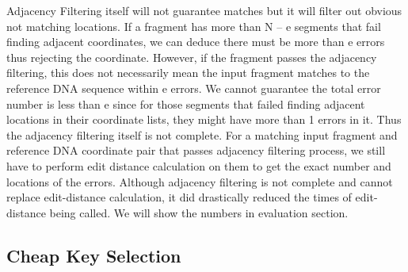 Adjacency Filtering itself will not guarantee matches but it will filter out
obvious not matching locations. If a fragment has more than N – e segments that
fail finding adjacent coordinates, we can deduce there must be more than e
errors thus rejecting the coordinate. However, if the fragment passes the
adjacency filtering, this does not necessarily mean the input fragment matches
to the reference DNA sequence within e errors. We cannot guarantee the total
error number is less than e since for those segments that failed finding
adjacent locations in their coordinate lists, they might have more than 1
errors in it.  Thus the adjacency filtering itself is not complete. For a
matching input fragment and reference DNA coordinate pair that passes adjacency
filtering process, we still have to perform edit distance calculation on them
to get the exact number and locations of the errors.  Although adjacency
filtering is not complete and cannot replace edit-distance calculation, it did
drastically reduced the times of edit-distance being called. We will show the
numbers in evaluation section.\\

\subsection{Cheap Key Selection} \label{sec:cheapkey}

